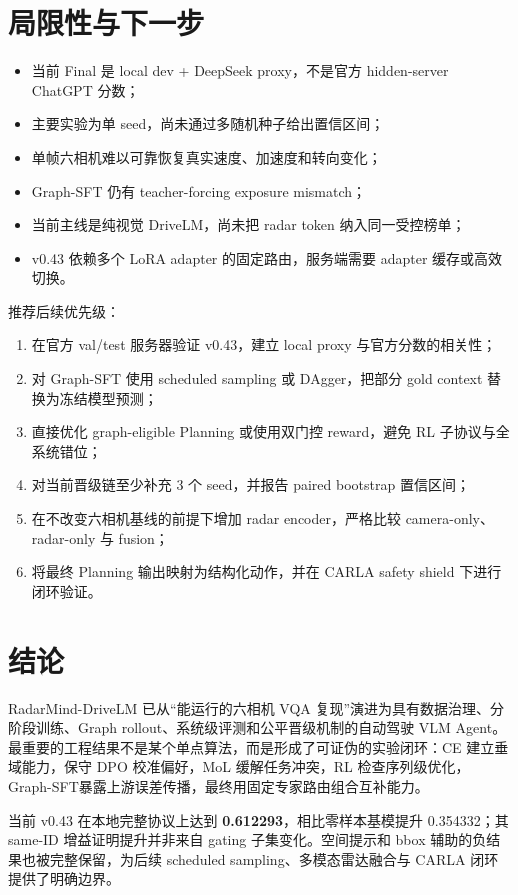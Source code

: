 \documentclass[UTF8,a4paper,11pt]{ctexart}
\newcommand{\metric}[1]{\textbf{\color{RadarBlue}#1}}
\begin{document}
\section{局限性与下一步}
\begin{itemize}
  \item 当前 Final 是 local dev + DeepSeek proxy，不是官方 hidden-server ChatGPT 分数；
  \item 主要实验为单 seed，尚未通过多随机种子给出置信区间；
  \item 单帧六相机难以可靠恢复真实速度、加速度和转向变化；
  \item Graph-SFT 仍有 teacher-forcing exposure mismatch；
  \item 当前主线是纯视觉 DriveLM，尚未把 radar token 纳入同一受控榜单；
  \item v0.43 依赖多个 LoRA adapter 的固定路由，服务端需要 adapter 缓存或高效切换。
\end{itemize}

推荐后续优先级：
\begin{enumerate}
  \item 在官方 val/test 服务器验证 v0.43，建立 local proxy 与官方分数的相关性；
  \item 对 Graph-SFT 使用 scheduled sampling 或 DAgger，把部分 gold context 替换为冻结模型预测；
  \item 直接优化 graph-eligible Planning 或使用双门控 reward，避免 RL 子协议与全系统错位；
  \item 对当前晋级链至少补充 3 个 seed，并报告 paired bootstrap 置信区间；
  \item 在不改变六相机基线的前提下增加 radar encoder，严格比较 camera-only、radar-only 与 fusion；
  \item 将最终 Planning 输出映射为结构化动作，并在 CARLA safety shield 下进行闭环验证。
\end{enumerate}

\section{结论}
RadarMind-DriveLM 已从“能运行的六相机 VQA 复现”演进为具有数据治理、分阶段训练、Graph rollout、系统级评测和公平晋级机制的自动驾驶 VLM Agent。最重要的工程结果不是某个单点算法，而是形成了可证伪的实验闭环：CE 建立垂域能力，保守 DPO 校准偏好，MoL 缓解任务冲突，RL 检查序列级优化，Graph-SFT暴露上游误差传播，最终用固定专家路由组合互补能力。

当前 v0.43 在本地完整协议上达到 \metric{0.612293}，相比零样本基模提升 0.354332；其 same-ID 增益证明提升并非来自 gating 子集变化。空间提示和 bbox 辅助的负结果也被完整保留，为后续 scheduled sampling、多模态雷达融合与 CARLA 闭环提供了明确边界。
\end{document}
